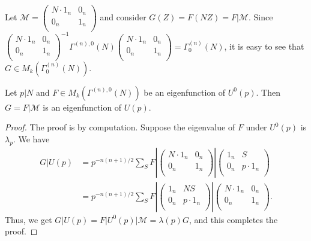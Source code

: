 \documentclass[11pt]{amsart}
\numberwithin{equation}{section}
\newcommand{\mc}{\mathcal}
\newcommand{\smat}[4]{\left( \begin{smallmatrix} #1 & #2 \\ #3 & #4 \\ \end{smallmatrix} \right)}
\newcommand{\sumn}{\sum \nolimits}
\begin{document}
Let $\mc M= \smat{N\cdot 1_n}{0_n}{0_n}{1_n}$ and consider $G(Z)=F(N Z)=F|\mc M$. Since $\smat{N\cdot 1_n}{0_n}{0_n}{1_n}^{-1}\Gamma^{(n),0}(N) \smat{N\cdot 1_n}{0_n}{0_n}{1_n}= \Gamma_0^{(n)}(N)$, it is easy to see that $G \in M_k(\Gamma_0^{(n)}(N))$. 

\begin{lemma}\label{U^0-U_0}
    Let $p|N$ and $F\in M_k(\Gamma^{(n),0}(N))$ be an eigenfunction of $U^0(p)$. Then $G=F|\mc M$ is an eigenfunction of $U(p)$.
\end{lemma}
\begin{proof}
   The proof is by computation. Suppose the eigenvalue of $F$ under $U^0(p)$ is $\lambda_p$. We have
    \begin{align}
       G|U(p)&= p^{-n(n+1)/2}\sumn_{S} F|\smat{N\cdot 1_n}{0_n}{0_n}{1_n}|\smat{1_n}{S}{0_n}{p\cdot 1_n}\\
       &=  p^{-n(n+1)/2}\sumn_{S} F|\smat{1_n}{NS}{0_n}{p\cdot 1_n}|\smat{N\cdot 1_n}{0_n}{0_n}{1_n}.
    \end{align}
Thus, we get $G|U(p)=F|U^0(p)|\mc M=\lambda(p) G$, and this completes the proof.  
\end{proof}
\end{document}
